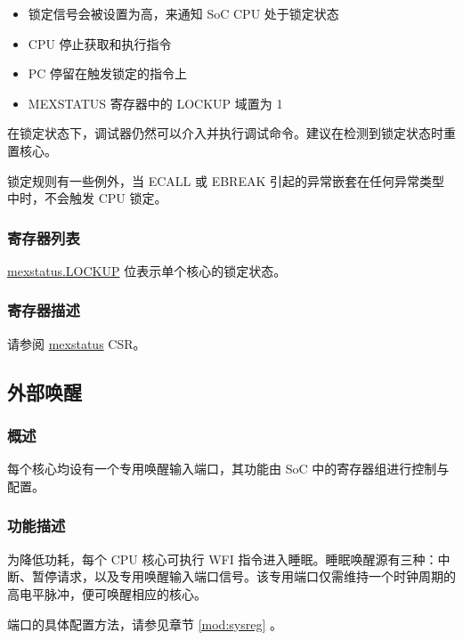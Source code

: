 \documentclass[main\_\_CN.tex]{subfiles}
\begin{document}
\begin{itemize}
    \item 锁定信号会被设置为高，来通知 SoC CPU 处于锁定状态
    \item CPU 停止获取和执行指令
    \item PC 停留在触发锁定的指令上
    \item MEXSTATUS 寄存器中的 LOCKUP 域置为 1
\end{itemize}

在锁定状态下，调试器仍然可以介入并执行调试命令。建议在检测到锁定状态时重置核心。

锁定规则有一些例外，当 ECALL 或 EBREAK 引起的异常嵌套在任何异常类型中时，不会触发 CPU 锁定。

\subsubsection{寄存器列表}
\label{sec:riscvcpu-custom-lockup-reg-summ}

\hyperref[fielddesc:MEXSTATUS_LOCKUP]{mexstatus.LOCKUP} 位表示单个核心的锁定状态。

\subsubsection{寄存器描述}
\label{sec:riscvcpu-custom-lockup-reg-desc}
请参阅 \hyperref[regdesc:MEXSTATUS]{mexstatus} CSR。


\subsection{外部唤醒}
\label{sec:riscvcpu-custom-ext-wakeup-features}
\subsubsection{概述}
\label{sec:riscvcpu-custom-ext-wakeup-overview}

每个核心均设有一个专用唤醒输入端口，其功能由 SoC 中的寄存器组进行控制与配置。

\subsubsection{功能描述}
\label{sec:riscvcpu-custom-ext-wakeup-func-descr}

为降低功耗，每个 CPU 核心可执行 WFI 指令进入睡眠。睡眠唤醒源有三种：中断、暂停请求，以及专用唤醒输入端口信号。该专用端口仅需维持一个时钟周期的高电平脉冲，便可唤醒相应的核心。

端口的具体配置方法，请参见章节 \ref{mod:sysreg} \textit{}。
\end{document}
